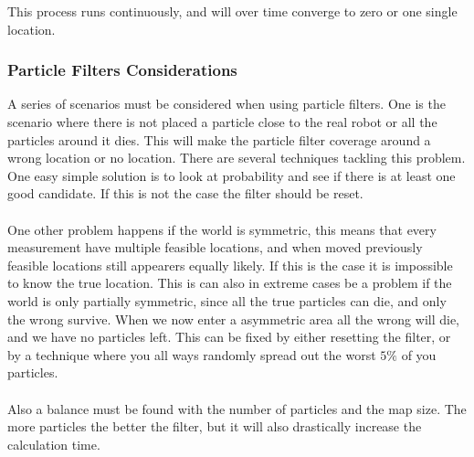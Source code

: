 This process runs continuously, and will over time converge to zero or one single location.

\subsubsection{Particle Filters Considerations}
A series of scenarios must be considered when using particle filters. One is the scenario where there is not placed a particle close to the real robot or all the particles around it dies. This will make the particle filter coverage around a wrong location or no location. There are several techniques tackling this problem. One easy simple solution is to look at probability and see if there is at least one good candidate. If this is not the case the filter should be reset. 
\\\\
One other problem happens if the world is symmetric, this means that every measurement have multiple feasible locations, and when moved previously feasible locations still appearers equally likely. If this is the case it is impossible to know the true location. This is can also in extreme cases be a problem if the world is only partially symmetric, since all the true particles can die, and only the wrong survive. When we now enter a asymmetric area all the wrong will die, and we have no particles left. This can be fixed by either resetting the filter, or by a technique where you all ways randomly spread out the worst $5\%$ of you particles. 
\\\\
Also a balance must be found with the number of particles and the map size. The more particles the better the filter, but it will also drastically increase the calculation time. 

